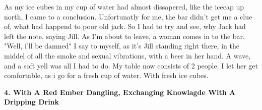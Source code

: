\documentclass[]{article}
\begin{document}
As my ice cubes in my cup of water had almost dissapered, like the icecap up north, I came to a conclusion. Unfortunatly for me, the bar didn't get me a clue of, what had happend to poor old jack. So I had to try and see, why Jack had left the note, saying Jill. As I'm about to leave, a woman comes in to the bar. "Well, i'll be damned" I say to myself, as it's Jill standing right there, in the middel of all the smoke and sexual vibrations, with a beer in her hand. A wave, and a soft yell was all I had to do. My table now consists of 2 people. I let her get comfortable, as i go for a fresh cup of water. With fresh ice cubes.
\newpage

\begin{center}
\large\textbf{4. With A Red Ember Dangling, \newline Exchanging Knowlagde With A Dripping Drink}
\end{center}
\end{document}
